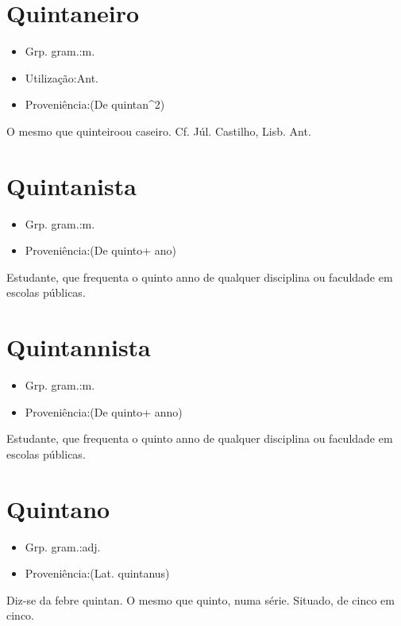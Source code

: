 \section{Quintaneiro}
\begin{itemize}
\item {Grp. gram.:m.}
\end{itemize}
\begin{itemize}
\item {Utilização:Ant.}
\end{itemize}
\begin{itemize}
\item {Proveniência:(De \textunderscore quintan\textunderscore ^2)}
\end{itemize}
O mesmo que \textunderscore quinteiro\textunderscore  ou caseiro. Cf. Júl. Castilho, \textunderscore Lisb. Ant.\textunderscore 
\section{Quintanista}
\begin{itemize}
\item {Grp. gram.:m.}
\end{itemize}
\begin{itemize}
\item {Proveniência:(De \textunderscore quinto\textunderscore  + \textunderscore ano\textunderscore )}
\end{itemize}
Estudante, que frequenta o quinto anno de qualquer disciplina ou faculdade em escolas públicas.
\section{Quintannista}
\begin{itemize}
\item {Grp. gram.:m.}
\end{itemize}
\begin{itemize}
\item {Proveniência:(De \textunderscore quinto\textunderscore  + \textunderscore anno\textunderscore )}
\end{itemize}
Estudante, que frequenta o quinto anno de qualquer disciplina ou faculdade em escolas públicas.
\section{Quintano}
\begin{itemize}
\item {Grp. gram.:adj.}
\end{itemize}
\begin{itemize}
\item {Proveniência:(Lat. \textunderscore quintanus\textunderscore )}
\end{itemize}
Diz-se da febre quintan.
O mesmo que \textunderscore quinto\textunderscore , numa série.
Situado, de cinco em cinco.

